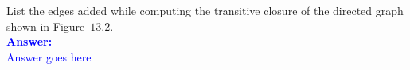 \item{}
List the edges added while computing the transitive closure of the directed
graph shown in Figure~$13.2$.\\[12pt]
\ifanswers
\textcolor{blue}{
\textbf{Answer:}\\[6pt]
Answer goes here
}
\newpage
\fi
